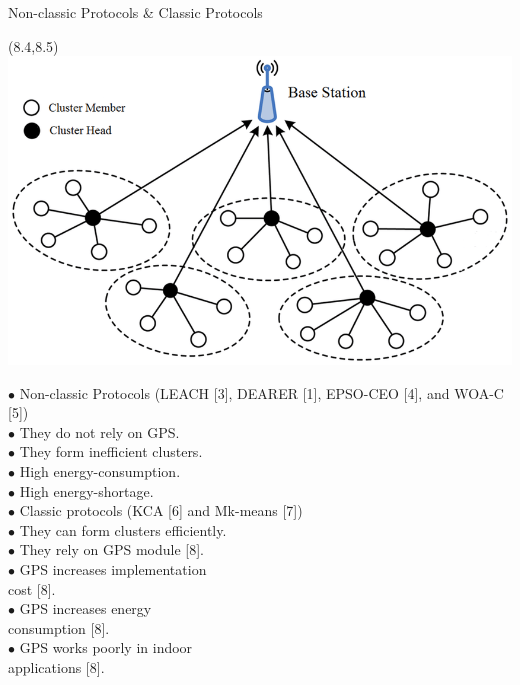 \documentclass{beamer}
\begin{document}
\begin{frame}[t]{Non-classic Protocols \& Classic Protocols} %

\begin{textblock}{0.5}(8.4,8.5)
\includegraphics[scale=0.2]{figure/Hierarchical.png}
\end{textblock}

\small
$\bullet$ Non-classic Protocols (LEACH [3], DEARER [1], EPSO-CEO [4], and WOA-C [5])\\
\quad $\bullet$ {\color{green} They do not rely on GPS.}	\\
\quad $\bullet$ {\color{red} They form inefficient clusters.} \\
\quad $\bullet$ {\color{red} High energy-consumption.} \\
\quad $\bullet$ {\color{red} High energy-shortage.} \\
$\bullet$ Classic protocols (KCA [6] and Mk-means [7])\\
\quad $\bullet$ {\color{green} They can form clusters efficiently.}	\\
\quad $\bullet$ {\color{red} They rely on GPS module [8].} \\
\quad \quad $\bullet$ {\color{red} GPS increases implementation \\ \quad \quad \quad cost [8].}\\
\quad \quad $\bullet$ {\color{red} GPS increases energy  \\ \quad \quad \quad  consumption [8].}\\
\quad \quad $\bullet$ {\color{red} GPS works poorly in indoor  \\ \quad \quad \quad  applications [8].}\\
\end{frame}
\end{document}
